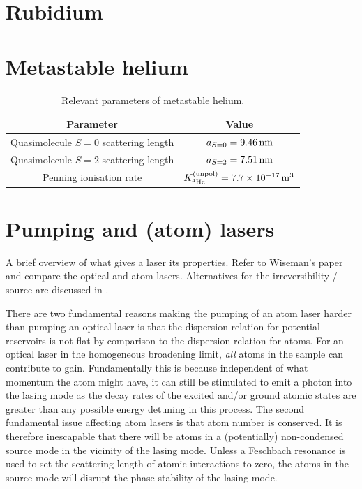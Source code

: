 \section{Rubidium}
\label{BackgroundTheory:Rubidium}
\section{Metastable helium}
\label{BackgroundTheory:Helium}

\begin{table}
    \centering
    \begin{tabular}{cc}
    \toprule
    Parameter & Value\\
    \midrule
    Quasimolecule $S=0$ scattering length & $a_{S=0}=\unit[9.46]{nm}$\\
    Quasimolecule $S=2$ scattering length & $a_{S=2}=\unit[7.51]{nm}$\\
    Penning ionisation rate & $\Kunpol = \unit[7.7\times 10^{-17}]{m\textsuperscript{3}}$\\
    \bottomrule
    \end{tabular}
    \caption{\label{BackgroundTheory:He*Parameters} Relevant parameters of metastable helium.}
\end{table}


\section{Pumping and (atom) lasers}
\label{BackgroundTheory:Lasers}
A brief overview of what gives a laser its properties. Refer to Wiseman's paper~\citep{Wiseman:1997ba} and compare the optical and atom lasers. Alternatives for the irreversibility / source are discussed in .

There are two fundamental reasons making the pumping of an atom laser harder than pumping an optical laser is that the dispersion relation for potential reservoirs is not flat by comparison to the dispersion relation for atoms.  For an optical laser in the homogeneous broadening limit, \emph{all} atoms in the sample can contribute to gain.  Fundamentally this is because independent of what momentum the atom might have, it can still be stimulated to emit a photon into the lasing mode as the decay rates of the excited and/or ground atomic states are greater than any possible energy detuning in this process.  The second fundamental issue affecting atom lasers is that atom number is conserved.  It is therefore inescapable that there will be atoms in a (potentially) non-condensed source mode in the vicinity of the lasing mode.  Unless a Feschbach resonance is used to set the scattering-length of atomic interactions to zero, the atoms in the source mode will disrupt the phase stability of the lasing mode.


